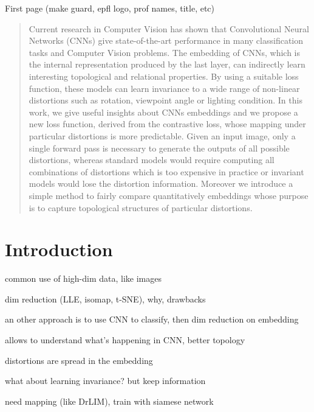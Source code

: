 \documentclass[a4paper,12pt]{report}
\begin{document}
\thispagestyle{empty}
First page (make guard, epfl logo, prof names, title, etc)

\newpage
\begin{abstract}
    Current research in Computer Vision has shown that Convolutional Neural Networks (CNNs) give state-of-the-art performance in many classification tasks and Computer Vision problems.
    The embedding of CNNs, which is the internal representation produced by the last layer, can indirectly learn interesting topological and relational properties.
    By using a suitable loss function, these models can learn invariance to a wide range of non-linear distortions such as rotation, viewpoint angle or lighting condition.
    In this work, we give useful insights about CNNs embeddings and we propose a new loss function, derived from the contrastive loss, whose mapping under particular distortions is more predictable.
    Given an input image, only a single forward pass is necessary to generate the outputs of all possible distortions, whereas standard models would require computing all combinations of distortions which is too expensive in practice or invariant models would lose the distortion information.
    Moreover we introduce a simple method to fairly compare quantitatively embeddings whose purpose is to capture topological structures of particular distortions.
\end{abstract}

\tableofcontents


\chapter{Introduction}
common use of high-dim data, like images

dim reduction (LLE, isomap, t-SNE), why, drawbacks

an other approach is to use CNN to classify, then dim reduction on embedding

allows to understand what's happening in CNN, better topology

distortions are spread in the embedding

what about learning invariance? but keep information

need mapping (like DrLIM), train with siamese network
\end{document}
